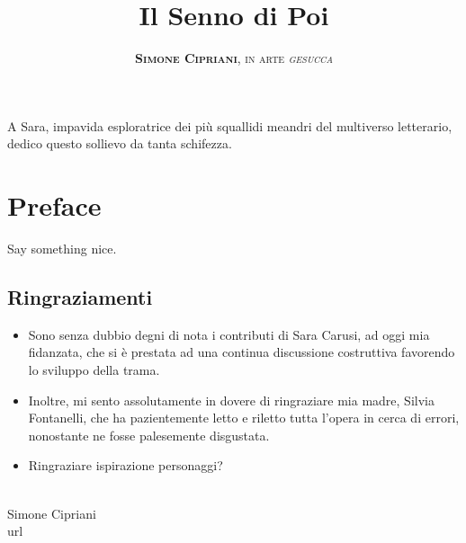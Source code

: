 \documentclass[11pt]{book}
\title{
	\Huge \textbf{Il Senno di Poi}
}
\author{
	\textsc{\textbf{Simone Cipriani}, in arte \textit{gesucca}}
}
\newenvironment{dedication} {
	\cleardoublepage\thispagestyle{empty}
	\vspace*{\stretch{1}}
	\hfill\begin{minipage}[t]{0.66\textwidth}
	\raggedright}
{
	\end{minipage}
	\vspace*{\stretch{3}}
	\clearpage
}
\begin{document}
\frontmatter
\maketitle
\begin{dedication}
	A Sara, impavida esploratrice dei più squallidi meandri del multiverso letterario, dedico questo sollievo da tanta schifezza.
\end{dedication}

\mainmatter\chapter*{Preface}

Say something nice.

\section*{Ringraziamenti}
\begin{itemize}
	\item Sono senza dubbio degni di nota i contributi di Sara Carusi, ad oggi mia fidanzata, che si è prestata ad una continua discussione costruttiva favorendo lo sviluppo della trama.
	\item Inoltre, mi sento assolutamente in dovere di ringraziare mia madre, Silvia Fontanelli, che ha pazientemente letto e riletto tutta l'opera in cerca di errori, nonostante ne fosse palesemente disgustata.
	\item Ringraziare ispirazione personaggi?
\end{itemize}
\mbox{} \\
\noindent Simone Cipriani \\
\noindent url

\newpage
\tableofcontents
\newpage






















\end{document}

